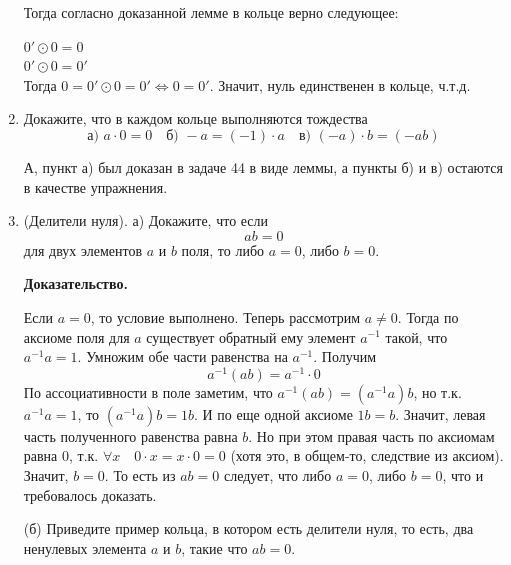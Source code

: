 \documentclass[]{book}
\theoremstyle{definition}
\begin{document}
\begin{enumerate}[resume]
Тогда согласно доказанной лемме в кольце верно следующее:

$0'\odot0 = 0$\\
$0'\odot0 = 0'$\\
Тогда $0 = 0'\odot0 = 0' \Longleftrightarrow 0 = 0'$. Значит, нуль единственен в кольце, ч.т.д.


\item Докажите, что в каждом кольце выполняются тождества
$$\text{а) } a\cdot 0 = 0 \quad \text{б) } -a = (-1)\cdot a \quad \text{в) } (-a)\cdot b = (-ab)$$

А, пункт а) был доказан в задаче 44 в виде леммы, а пункты б) и в) остаются в качестве упражнения.


\item (Делители нуля). а) Докажите, что если
$$ab = 0$$
для двух элементов $a$ и $b$ поля, то либо $a = 0$, либо $b = 0$.

\textbf{Доказательство.}

Если $a = 0$, то условие выполнено. Теперь рассмотрим $a \neq 0$. Тогда по аксиоме поля для $a$ существует обратный ему элемент $a^{-1}$ такой, что $a^{-1}a = 1$. Умножим обе части равенства на $a^{-1}$. Получим 
$$a^{-1}(ab) = a^{-1}\cdot 0$$
По ассоциативности в поле заметим, что $a^{-1}(ab) = (a^{-1}a)b$, но т.к. $a^{-1}a = 1$, то $(a^{-1}a)b = 1b$. И по еще одной аксиоме $1b = b$. Значит, левая часть полученного равенства равна $b$. Но при этом правая часть по аксиомам равна $0$, т.к. $\forall x \quad 0\cdot x = x\cdot 0 = 0$ (хотя это, в общем-то, следствие из аксиом). Значит, $b = 0$. То есть из $ab= 0$ следует, что либо $a = 0$, либо $b = 0$, что и требовалось доказать.


(б) Приведите пример кольца, в котором есть делители нуля, то есть, два ненулевых элемента $a$ и $b$, такие что $ab = 0$.


\end{enumerate}
\end{document}
